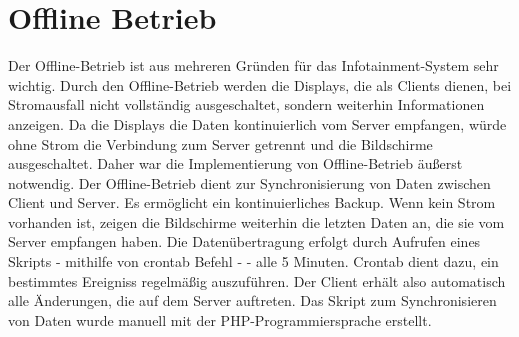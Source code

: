 \section{Offline Betrieb}
Der Offline-Betrieb ist aus mehreren Gründen für das Infotainment-System sehr wichtig. Durch den Offline-Betrieb werden die Displays, die als Clients dienen, bei Stromausfall nicht vollständig ausgeschaltet, sondern weiterhin Informationen anzeigen. Da die Displays die Daten kontinuierlich vom Server empfangen, würde ohne Strom die Verbindung zum Server getrennt und die Bildschirme ausgeschaltet. Daher war die Implementierung von Offline-Betrieb äußerst notwendig. Der Offline-Betrieb dient zur Synchronisierung von Daten zwischen Client und Server. Es ermöglicht ein kontinuierliches Backup. Wenn kein Strom vorhanden ist, zeigen die Bildschirme weiterhin die letzten Daten an, die sie vom Server empfangen haben. Die Datenübertragung erfolgt durch Aufrufen eines Skripts - mithilfe von crontab Befehl  - - alle 5 Minuten. Crontab dient dazu, ein bestimmtes Ereigniss regelm\"a\ss{}ig auszuf\"uhren. Der Client erhält also automatisch alle Änderungen, die auf dem Server auftreten. Das Skript zum Synchronisieren von Daten wurde manuell mit der PHP-Programmiersprache erstellt.
